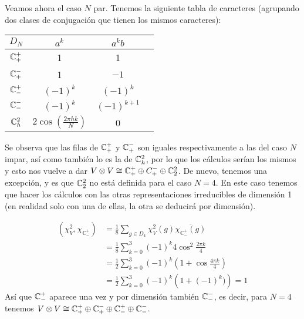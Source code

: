 \documentclass[twoside]{article}
\begin{document}
\begin{solucion}
\begin{enumerate}[(a)]
Veamos ahora el caso $N$ par. Tenemos la siguiente tabla de caracteres (agrupando dos clases de conjugación que tienen los mismos caracteres):

\begin{tabular}{|c|c|c|c|}
\hline
$D_N$       &  $a^k$   &  $a^kb$ \\
\hline
$\mathbb{C}_+^+$    &   1      &    1    \\
\hline
$\mathbb{C}_+^-$    &   1      &   $-1$   \\
\hline
$\mathbb{C}_-^+$    & $(-1)^k$ &   $(-1)^k$ \\
\hline
$\mathbb{C}_-^-$    & $(-1)^k$ & $(-1)^{k+1}$ \\
\hline
$\mathbb{C}^2_h$    & $2\cos(\frac{2\pi h k}{N})$ & 0\\
\hline
\end{tabular}

Se observa que las filas de $\mathbb{C}_+^+$ y $\mathbb{C}_+^-$ son iguales respectivamente a las del caso $N$ impar, así como también lo es la de $\mathbb{C}^2_h$, por lo que los cálculos serían los mismos y esto nos vuelve a dar $V\otimes V\cong \mathbb{C}_+^+\oplus C_+^-\oplus \mathbb{C}^2_2$. De nuevo, tenemos una excepción, y es que $\mathbb{C}_2^2$ no está definida para el caso $N=4$. En este caso tenemos que hacer los cálculos con las otras representaciones irreducibles de dimensión 1 (en realidad solo con una de ellas, la otra se deducirá por dimensión). 

\begin{align*}
(\chi_{V}^2, \chi_{\mathbb{C}_-^+})
&= \frac{1}{8} \sum_{g \in D_4} \chi_{V}^2(g)\overline{\chi_{\mathbb{C}_-^+}(g)} \\
&= \frac{1}{8} \sum_{k=0}^{3} (-1)^k4 \cos^2 \frac{2\pi k}{4} \\
&= \frac{1}{2} \sum_{k=0}^{3} (-1)^k\left(1 + \cos \frac{4\pi k}{4}\right)\\
&=\frac{1}{2} \sum_{k=0}^{3} (-1)^k\left(1 + (-1)^k)\right)=1
\end{align*}
Así que $\mathbb{C}_-^+$ aparece una vez y por dimensión también $\mathbb{C}_-^-$, es decir, para $N=4$ tenemos $V\otimes V\cong \mathbb{C}_+^+ \oplus\mathbb{C}_+^- \oplus \mathbb{C}_-^+ \oplus \mathbb{C}_-^-$. 

\end{enumerate}

\end{solucion}
\end{document}
